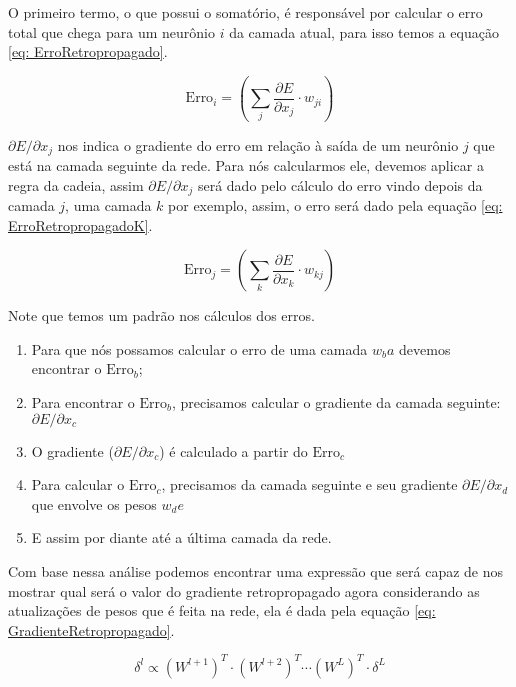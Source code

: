 O primeiro termo, o que possui o somatório, é responsável por calcular o erro total que chega para um neurônio $i$ da camada atual, para isso temos a equação \ref{eq: ErroRetropropagado}.

\begin{equation}
    \text{Erro}_i = \left( \sum_j \frac{\partial E}{\partial x_j} \cdot w_{ji} \right)
    \label{eq: ErroRetropropagado}
\end{equation}

$\partial E / \partial x_j$ nos indica o gradiente do erro em relação à saída de um neurônio $j$ que está na camada seguinte da rede. Para nós calcularmos ele, devemos aplicar a regra da cadeia, assim $\partial E / \partial x_j$ será dado pelo cálculo do erro vindo depois da camada $j$, uma camada $k$ por exemplo, assim, o erro será dado pela equação \ref{eq: ErroRetropropagadoK}.

\begin{equation}
    \text{Erro}_j = \left( \sum_k \frac{\partial E}{\partial x_k} \cdot w_{kj} \right)
    \label{eq: ErroRetropropagadoK}
\end{equation}

Note que temos um padrão nos cálculos dos erros.

\begin{enumerate}
    \item Para que nós possamos calcular o erro de uma camada $w_ba$ devemos encontrar o $\text{Erro}_b$;
    \item Para encontrar o $\text{Erro}_b$, precisamos calcular o gradiente da camada seguinte: $\partial E / \partial x_c$
    \item O gradiente ($\partial E / \partial x_c$) é calculado a partir do $\text{Erro}_c$
    \item Para calcular o $\text{Erro}_c$, precisamos da camada seguinte e seu gradiente $\partial E / \partial x_d$ que envolve os pesos $w_de$
    \item E assim por diante até a última camada da rede.
\end{enumerate}

Com base nessa análise podemos encontrar uma expressão que será capaz de nos mostrar qual será o valor do gradiente retropropagado agora considerando as atualizações de pesos que é feita na rede, ela é dada pela equação \ref{eq: GradienteRetropropagado}.

\begin{equation}
    \delta^l \propto (W^{l+1})^T \cdot (W^{l+2})^T \cdots (W^L)^T \cdot \delta^L 
    \label{eq: GradienteRetropropagado}
\end{equation} 

